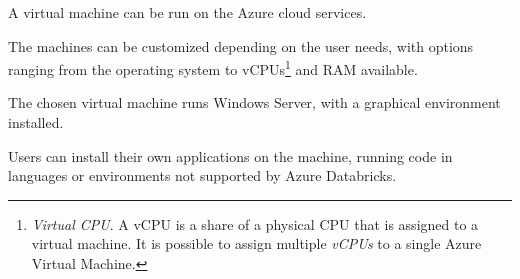 A virtual machine can be run on the Azure cloud services.

The machines can be customized depending on the user needs, with options ranging from the operating system to vCPUs\footnote{
    \textit{Virtual CPU}.
    A vCPU is a share of a physical CPU that is assigned to a virtual machine.
    It is possible to assign multiple \textit{vCPUs} to a single Azure Virtual Machine.
} and RAM available.

The chosen virtual machine runs Windows Server, with a graphical environment installed.

Users can install their own applications on the machine, running code in languages or environments not supported by Azure Databricks.
